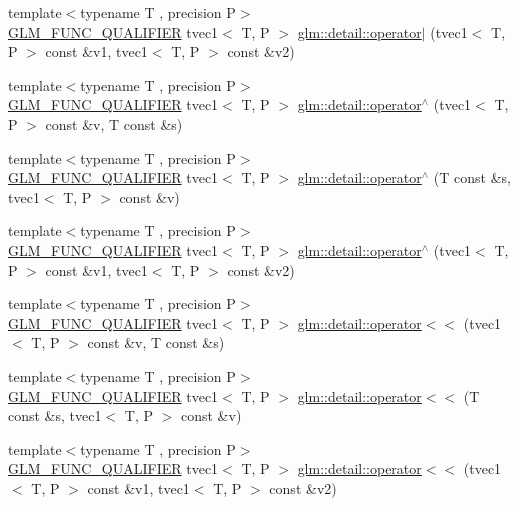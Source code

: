 \begin{DoxyCompactItemize}
{\footnotesize template$<$typename T , precision P$>$ }\\\hyperlink{setup_8hpp_a33fdea6f91c5f834105f7415e2a64407}{G\+L\+M\+\_\+\+F\+U\+N\+C\+\_\+\+Q\+U\+A\+L\+I\+F\+I\+ER} tvec1$<$ T, P $>$ \hyperlink{namespaceglm_1_1detail_a0a8afbcd1b925baa36662cea9070e91c}{glm\+::detail\+::operator$\vert$} (tvec1$<$ T, P $>$ const \&v1, tvec1$<$ T, P $>$ const \&v2)
\item 
{\footnotesize template$<$typename T , precision P$>$ }\\\hyperlink{setup_8hpp_a33fdea6f91c5f834105f7415e2a64407}{G\+L\+M\+\_\+\+F\+U\+N\+C\+\_\+\+Q\+U\+A\+L\+I\+F\+I\+ER} tvec1$<$ T, P $>$ \hyperlink{namespaceglm_1_1detail_a34263bc4025d488a6ac5bd3f0afab262}{glm\+::detail\+::operator$^\wedge$} (tvec1$<$ T, P $>$ const \&v, T const \&s)
\item 
{\footnotesize template$<$typename T , precision P$>$ }\\\hyperlink{setup_8hpp_a33fdea6f91c5f834105f7415e2a64407}{G\+L\+M\+\_\+\+F\+U\+N\+C\+\_\+\+Q\+U\+A\+L\+I\+F\+I\+ER} tvec1$<$ T, P $>$ \hyperlink{namespaceglm_1_1detail_afa0713e05d8158e494277bb28fb39f2f}{glm\+::detail\+::operator$^\wedge$} (T const \&s, tvec1$<$ T, P $>$ const \&v)
\item 
{\footnotesize template$<$typename T , precision P$>$ }\\\hyperlink{setup_8hpp_a33fdea6f91c5f834105f7415e2a64407}{G\+L\+M\+\_\+\+F\+U\+N\+C\+\_\+\+Q\+U\+A\+L\+I\+F\+I\+ER} tvec1$<$ T, P $>$ \hyperlink{namespaceglm_1_1detail_accd031d5a359586905b7643a4f0d786a}{glm\+::detail\+::operator$^\wedge$} (tvec1$<$ T, P $>$ const \&v1, tvec1$<$ T, P $>$ const \&v2)
\item 
{\footnotesize template$<$typename T , precision P$>$ }\\\hyperlink{setup_8hpp_a33fdea6f91c5f834105f7415e2a64407}{G\+L\+M\+\_\+\+F\+U\+N\+C\+\_\+\+Q\+U\+A\+L\+I\+F\+I\+ER} tvec1$<$ T, P $>$ \hyperlink{namespaceglm_1_1detail_a6ff7b1ac83e22b4fb831caf1631d2414}{glm\+::detail\+::operator$<$$<$} (tvec1$<$ T, P $>$ const \&v, T const \&s)
\item 
{\footnotesize template$<$typename T , precision P$>$ }\\\hyperlink{setup_8hpp_a33fdea6f91c5f834105f7415e2a64407}{G\+L\+M\+\_\+\+F\+U\+N\+C\+\_\+\+Q\+U\+A\+L\+I\+F\+I\+ER} tvec1$<$ T, P $>$ \hyperlink{namespaceglm_1_1detail_ab8cfc0312f8ef072b940552cd95402cf}{glm\+::detail\+::operator$<$$<$} (T const \&s, tvec1$<$ T, P $>$ const \&v)
\item 
{\footnotesize template$<$typename T , precision P$>$ }\\\hyperlink{setup_8hpp_a33fdea6f91c5f834105f7415e2a64407}{G\+L\+M\+\_\+\+F\+U\+N\+C\+\_\+\+Q\+U\+A\+L\+I\+F\+I\+ER} tvec1$<$ T, P $>$ \hyperlink{namespaceglm_1_1detail_a0574edcccb39121d90eedac14214ce26}{glm\+::detail\+::operator$<$$<$} (tvec1$<$ T, P $>$ const \&v1, tvec1$<$ T, P $>$ const \&v2)

\end{DoxyCompactItemize}
